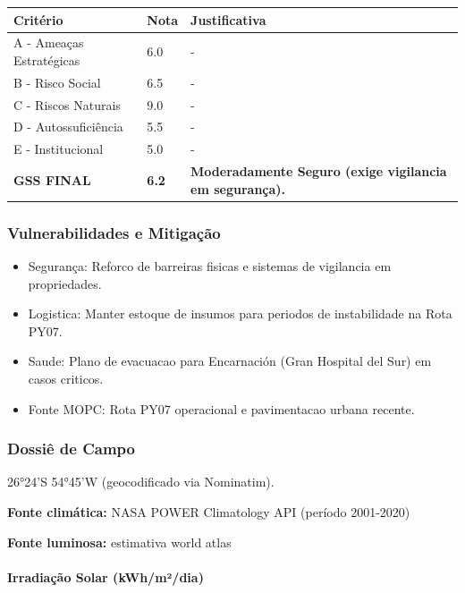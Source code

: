 \begin{table}[ht!]
\small \begin{tabular}{p{3.0cm}p{0.8cm}p{6.0cm}} \toprule
\textbf{Critério} & \textbf{Nota} & \textbf{Justificativa} \\ \midrule
A - Ameaças Estratégicas & 6.0 & - \\
B - Risco Social & 6.5 & - \\
C - Riscos Naturais & 9.0 & - \\
D - Autossuficiência & 5.5 & - \\
E - Institucional & 5.0 & - \\
\midrule \textbf{GSS FINAL} & \textbf{6.2} & \textbf{Moderadamente Seguro (exige vigilancia em segurança).} \\ \bottomrule \end{tabular}
\end{table}
\subsubsection{Vulnerabilidades e
Mitigação}

\begin{itemize}
\item
  Segurança: Reforco de barreiras fisicas e sistemas de vigilancia em
  propriedades.
\item
  Logistica: Manter estoque de insumos para periodos de instabilidade na
  Rota PY07.
\item
  Saude: Plano de evacuacao para Encarnación (Gran Hospital del Sur) em
  casos criticos.
\item
  Fonte MOPC: Rota PY07 operacional e pavimentacao urbana recente.
\end{itemize}
\subsubsection{Dossiê de Campo}
\begin{description}[style=nextline,leftmargin=0.5cm,font=\bfseries]
\item[Coordenadas]  26°24'S 54°45'W (geocodificado via Nominatim).
\end{description}
\textbf{Fonte climática:} NASA POWER Climatology API (período 2001-2020)

\textbf{Fonte luminosa:} estimativa world atlas

\paragraph{Irradiação Solar
(kWh/\allowbreak m²/\allowbreak dia)}


